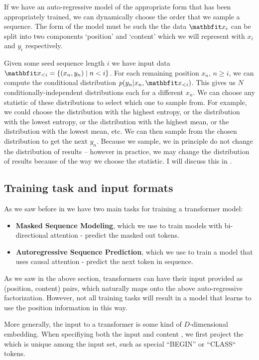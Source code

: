 If we have an auto-regressive model of the appropriate form that has been appropriately trained, we can dynamically choose the order that we sample a sequence. The form of the model must be such the the data $\x_i$ can be split into two components `position' and `content' which we will represent with $x_i$ and $y_i$ respectively.

Given some seed sequence length $i$ we have input data $\x_{<i} = \{ (x_n, y_n) \mid n < i \}$. For each remaining position $x_n$, $n ≥ i$, we can compute the conditional distribution $p(y_n | x_n,  \x_{<i})$. This gives us $N$ conditionally-independent distributions each for a different $x_n$. We can choose any statistic of these distributions to select which one to sample from. For example, we could choose the distribution with the highest entropy, or the distribution with the lowest entropy, or the distribution with the highest mean, or the distribution with the lowest mean, etc. We can then sample from the chosen distribution to get the next $y_n$. Because we sample, we in principle do not change the distribution of results -- however in practice, we may change the distribution of results because of the way we choose the statistic. I will discuss this in .


\subsection{Training task and input formats}
\label{ss:transformer-inputs}

As we saw before in  we have two main tasks for training a transformer model:

\begin{itemize}
    \item \textbf{Masked Sequence Modeling}, which we use to train models with bi-directional attention - predict the masked out tokens.
    \item \textbf{Autoregressive Sequence Prediction}, which we use to train a model that uses causal attention - predict the next token in sequence.
\end{itemize}

As we saw in the above section, transformers can have their input provided as (position, content) pairs, which naturally maps onto the above auto-regressive factorization. However, not all training tasks will result in a model that learns to use the position information in this way.

More generally, the input to a transformer is some kind of $D$-dimensional embedding. When specifiying both the input and content , we first project the which is unique among the input set, such as special ``BEGIN'' or ``CLASS`` tokens.


